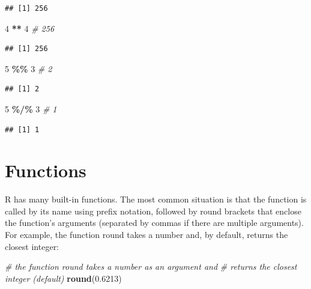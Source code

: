 \documentclass[
]{book}
\newenvironment{Shaded}{\begin{snugshade}}{\end{snugshade}}
\newcommand{\CommentTok}[1]{\textcolor[rgb]{0.56,0.35,0.01}{\textit{#1}}}
\newcommand{\DecValTok}[1]{\textcolor[rgb]{0.00,0.00,0.81}{#1}}
\newcommand{\FloatTok}[1]{\textcolor[rgb]{0.00,0.00,0.81}{#1}}
\newcommand{\FunctionTok}[1]{\textcolor[rgb]{0.13,0.29,0.53}{\textbf{#1}}}
\newcommand{\NormalTok}[1]{#1}
\newcommand{\SpecialCharTok}[1]{\textcolor[rgb]{0.81,0.36,0.00}{\textbf{#1}}}
\begin{document}
\begin{verbatim}
## [1] 256
\end{verbatim}

\begin{Shaded}
\begin{Highlighting}[]
\DecValTok{4} \SpecialCharTok{**} \DecValTok{4}  \CommentTok{\# 256}
\end{Highlighting}
\end{Shaded}

\begin{verbatim}
## [1] 256
\end{verbatim}

\begin{Shaded}
\begin{Highlighting}[]
\DecValTok{5} \SpecialCharTok{\%\%} \DecValTok{3}  \CommentTok{\# 2}
\end{Highlighting}
\end{Shaded}

\begin{verbatim}
## [1] 2
\end{verbatim}

\begin{Shaded}
\begin{Highlighting}[]
\DecValTok{5} \SpecialCharTok{\%/\%} \DecValTok{3} \CommentTok{\# 1}
\end{Highlighting}
\end{Shaded}

\begin{verbatim}
## [1] 1
\end{verbatim}

\hypertarget{functions}{%
\section{Functions}\label{functions}}

R has many built-in functions. The most common situation is that the function is called by its name using prefix notation, followed by round brackets that enclose the function's arguments (separated by commas if there are multiple arguments). For example, the function round takes a number and, by default, returns the closest integer:

\begin{Shaded}
\begin{Highlighting}[]
\CommentTok{\# the function \textasciigrave{}round\textasciigrave{} takes a number as an argument and }
\CommentTok{\# returns the closest integer (default)}
\FunctionTok{round}\NormalTok{(}\FloatTok{0.6213}\NormalTok{)}
\end{Highlighting}
\end{Shaded}
\end{document}
